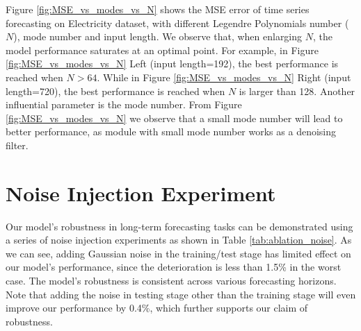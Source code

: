 \documentclass{article}
\begin{document}
Figure \ref{fig:MSE_vs_modes_vs_N} shows the MSE error of time series forecasting on Electricity dataset, with different Legendre Polynomials number ($N$), mode number and input length. We observe that, when enlarging $N$, the model performance saturates at an optimal point. For example, in Figure \ref{fig:MSE_vs_modes_vs_N} Left (input length=192), the best performance is reached when $N>64$. While in Figure \ref{fig:MSE_vs_modes_vs_N} Right (input length=720), the best performance is reached when $N$ is larger than 128. Another influential parameter is the mode number. From Figure \ref{fig:MSE_vs_modes_vs_N} we observe that a small mode number will lead to better performance, as module with small mode number works as a denoising filter. \section{Noise Injection Experiment}
\label{app:noise}
Our model's robustness in long-term forecasting tasks can be demonstrated using a series of noise injection experiments as shown in Table \ref{tab:ablation_noise}. As we can see, adding Gaussian noise in the training/test stage has limited effect on our model's performance, since the deterioration is less than 1.5\% in the worst case. The model's robustness is consistent across various forecasting horizons. Note that adding the noise in testing stage other than the training stage will even improve our performance by 0.4\%, which further supports our claim of robustness. 
\end{document}
